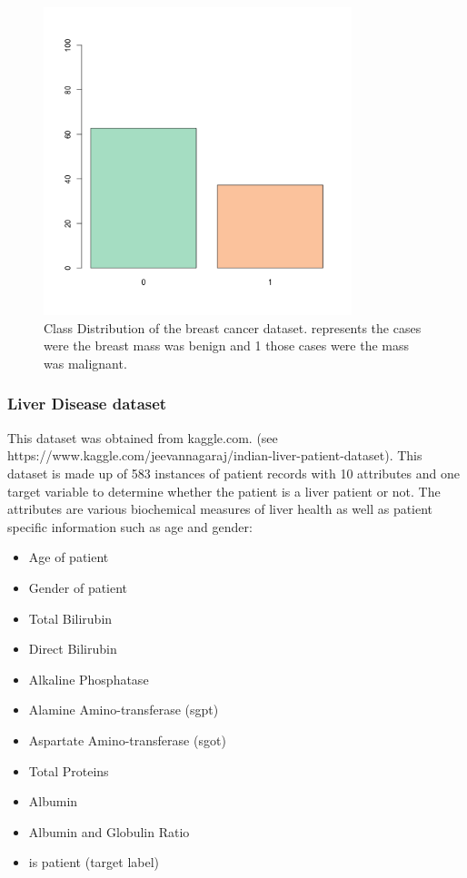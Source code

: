 \begin{figure}[H]
    \centering
    \includegraphics[width=0.8\textwidth]{ThesisTemplate/usingLatex/chapter4Images/figure4_4.png}
    \caption{Class Distribution of the breast cancer dataset. represents the cases were the breast mass was benign and 1 those cases were the mass was malignant.}
    \label{fig:my_label}
\end{figure}

\subsubsection{Liver Disease dataset}

This dataset was obtained from kaggle.com.\newline
(see https://www.kaggle.com/jeevannagaraj/indian-liver-patient-dataset). \newline
This dataset is made up of 583 instances of patient records with 10 attributes and one target variable to determine whether the patient is a liver patient or not. The attributes are various biochemical measures of liver health as well as patient specific information such as age and gender:
\begin{itemize}
    \item Age of patient
    \item Gender of patient
    \item Total Bilirubin
    \item Direct Bilirubin
    \item Alkaline Phosphatase
    \item Alamine Amino-transferase (sgpt)
    \item Aspartate Amino-transferase (sgot)
    \item Total Proteins
    \item Albumin
    \item Albumin and Globulin Ratio
    \item is patient (target label)
\end{itemize}

